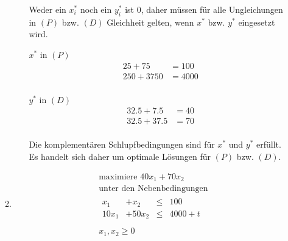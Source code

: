 \documentclass[a4paper]{scrartcl}
\begin{document}
\begin{enumerate}[label=\bfseries\arabic*.]
\begin{enumerate}
\begin{enumerate}[(i)]
                        Weder ein $x_i^*$ noch ein $y_i^*$ ist 0, daher müssen
                        für alle Ungleichungen in $(P)$ bzw. $(D)$ Gleichheit
                        gelten, wenn $x^*$ bzw. $y^*$ eingesetzt wird.

                        $x^*$ in $(P)$
                        \begin{equation}
                            \begin{split}
                                25 +75 &= 100 \\
                                250 +3750 &= 4000 \\
                            \end{split}
                        \end{equation}

                        $y^*$ in $(D)$
                        \begin{equation}
                            \begin{split}
                                32.5 +7.5 &= 40 \\
                                32.5 +37.5 &= 70 \\
                            \end{split}
                        \end{equation}
                        
                        Die komplementären Schlupfbedingungen sind für $x^*$
                        und $y^*$ erfüllt.
                        Es handelt sich daher um optimale Lösungen für $(P)$
                        bzw. $(D)$.

                \end{enumerate}

            \item
                \begin{equation}
                    \begin{gathered}
                        \text{maximiere }
                        40x_1 +70x_2 \\
                        \text{unter den Nebenbedingungen} \\
                        \begin{array}{rrcr}
                            x_1 & +x_2 & \leq & 100 \\
                            10x_1 & +50x_2 & \leq & 4000 + t \\
                        \end{array} \\
                        x_1, x_2 \geq 0
                    \end{gathered}
                \end{equation}


\end{enumerate}
\end{enumerate}
\end{document}
